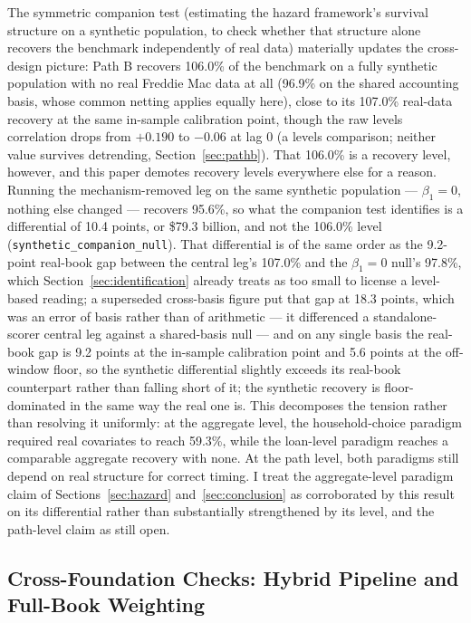 \documentclass[12pt]{article}
\begin{document}
The symmetric companion test (estimating the hazard framework's survival structure on a synthetic population, to check whether that structure alone recovers the benchmark independently of real data) materially updates the cross-design picture: Path B recovers 106.0\% of the benchmark on a fully synthetic population with no real Freddie Mac data at all (96.9\% on the shared accounting basis, whose common netting applies equally here), close to its 107.0\% real-data recovery at the same in-sample calibration point, though the raw levels correlation drops from $+0.190$ to $-0.06$ at lag 0 (a levels comparison; neither value survives detrending, Section~\ref{sec:pathb}). That 106.0\% is a recovery level, however, and this paper demotes recovery levels everywhere else for a reason. Running the mechanism-removed leg on the same synthetic population --- $\beta_1 = 0$, nothing else changed --- recovers 95.6\%, so what the companion test identifies is a differential of 10.4 points, or \$79.3 billion, and not the 106.0\% level (\texttt{synthetic\_companion\_null}). That differential is of the same order as the 9.2-point real-book gap between the central leg's 107.0\% and the $\beta_1 = 0$ null's 97.8\%, which Section~\ref{sec:identification} already treats as too small to license a level-based reading; a superseded cross-basis figure put that gap at 18.3 points, which was an error of basis rather than of arithmetic --- it differenced a standalone-scorer central leg against a shared-basis null --- and on any single basis the real-book gap is 9.2 points at the in-sample calibration point and 5.6 points at the off-window floor, so the synthetic differential slightly exceeds its real-book counterpart rather than falling short of it; the synthetic recovery is floor-dominated in the same way the real one is. This decomposes the tension rather than resolving it uniformly: at the aggregate level, the household-choice paradigm required real covariates to reach 59.3\%, while the loan-level paradigm reaches a comparable aggregate recovery with none. At the path level, both paradigms still depend on real structure for correct timing. I treat the aggregate-level paradigm claim of Sections~\ref{sec:hazard} and~\ref{sec:conclusion} as corroborated by this result on its differential rather than substantially strengthened by its level, and the path-level claim as still open.

\subsection{Cross-Foundation Checks: Hybrid Pipeline and Full-Book Weighting}\label{sec:robustness-hybrid}
\end{document}
